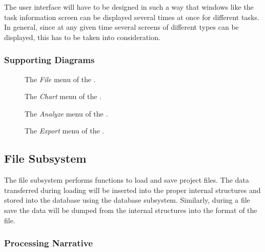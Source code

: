 The user interface will have to be designed in such a way that windows
like the task information screen can be displayed several times at
once for different tasks.  In general, since at any given time several
screens of different types can be displayed, this has to be taken into
consideration.

\subsubsection{Supporting Diagrams}

\begin{figure}
\centering
\centerline{}
\caption[File Menu]{\label{file-menu} 
The {\em File}\/ menu of the \pscreen.}
\end{figure}

\begin{figure}
\centering
\centerline{}
\caption[Chart Menu]{\label{chart-menu} 
The {\em Chart}\/ menu of the \pscreen.}
\end{figure}

\begin{figure}
\centering
\centerline{}
\caption[Analyze Menu]{\label{analyze-menu} 
The {\em Analyze}\/ menu of the \pscreen.}
\end{figure}

\begin{figure}
\centering
\centerline{}
\caption[Export Menu]{\label{export-menu} 
The {\em Export}\/ menu of the \pscreen.}
\end{figure}

\subsection{File Subsystem}

The file subsystem performs functions to load and save project files.
The data transferred during loading will be inserted into the proper
internal structures and stored into the database using the database
subsystem.  Similarly, during a file save the data will be dumped from
the internal structures into the format of the file.

\subsubsection{Processing Narrative}

